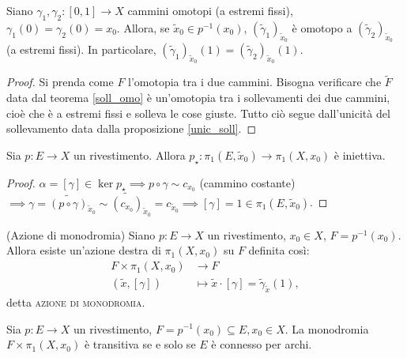 \begin{cor}
  Siano $\gamma_1, \gamma_2:[0, 1] \longrightarrow X$ cammini omotopi (a estremi fissi), $\gamma_1(0)=\gamma_2(0)=x_0$.
  Allora, se $\tilde{x}_0 \in p^{-1}(x_0)$, $(\tilde{\gamma}_1)_{\tilde{x}_0}$ è omotopo a $(\tilde{\gamma}_2)_{\tilde{x}_0}$ (a estremi fissi).
  In particolare, $(\tilde{\gamma}_1)_{\tilde{x}_0}(1)=(\tilde{\gamma}_2)_{\tilde{x}_0}(1)$.
\end{cor}

\begin{proof}
  Si prenda come $F$ l'omotopia tra i due cammini. Bisogna verificare che $\tilde{F}$ data dal teorema \ref{soll_omo} è un'omotopia tra i sollevamenti dei due cammini, cioè che è a estremi fissi e solleva le cose giuste. Tutto ciò segue dall'unicità del sollevamento data dalla proposizione \ref{unic_soll}.
\end{proof}

\begin{cor}
  Sia $p:E \longrightarrow X$ un rivestimento. Allora $p_{\star}:\pi_1(E, \tilde{x}_0) \longrightarrow \pi_1(X, x_0)$ è iniettiva.
\end{cor}

\begin{proof}
  $\alpha=[\gamma] \in \ker{p_{\star}} \implies p \circ \gamma \sim c_{x_0}$ (cammino costante)
  $\implies \gamma=\widetilde{(p \circ \gamma)}_{\tilde{x}_0} \sim \widetilde{(c_{x_0})}_{\tilde{x}_0}=c_{\tilde{x}_0} \implies [\gamma]=1 \in \pi_1(E, \tilde{x}_0)$.
\end{proof}

\begin{defn}
  (Azione di monodromia) Siano $p:E \longrightarrow X$ un rivestimento, $x_0 \in X$, $F=p^{-1}(x_0)$. Allora esiste un'azione destra di $\pi_1(X, x_0)$ su $F$ definita così:
  \begin{align*}
    F \times \pi_1(X, x_0) &\longrightarrow F \\
    (\tilde{x}, [\gamma]) &\longmapsto \tilde{x} \cdot [\gamma]=\tilde{\gamma}_{\tilde{x}}(1),
  \end{align*}
  detta \textsc{azione di monodromia}.
\end{defn}

\begin{oss}
  Sia $p:E \longrightarrow X$ un rivestimento, $F=p^{-1}(x_0) \subseteq E, x_0 \in X$. La monodromia $F \times \pi_1(X, x_0)$ è transitiva se e solo se $E$ è connesso per archi.
\end{oss}

